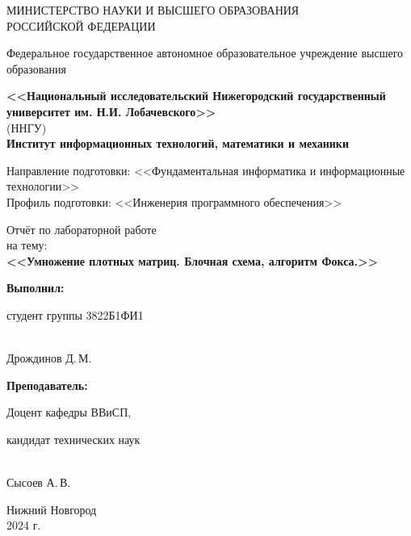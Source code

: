 \documentclass{report}
\begin{document}
\begin{titlepage}
	\begin{center}
		\large
		{МИНИСТЕРСТВО НАУКИ И ВЫСШЕГО ОБРАЗОВАНИЯ\\ РОССИЙСКОЙ ФЕДЕРАЦИИ}
		
		Федеральное государственное автономное образовательное учреждение высшего образования
		\vspace{0.5cm}
		
		\textbf{<<Национальный исследовательский Нижегородский государственный университет им. Н.И. Лобачевского>>}\\
		(ННГУ)\\
		\vspace{1cm}
		\textbf{Институт информационных технологий, математики и механики}\\
		\vspace{1cm}
		
		Направление подготовки: <<Фундаментальная информатика и информационные технологии>>\\
		Профиль подготовки: <<Инженерия программного обеспечения>>
		\vfill
		
		\vfill
		
		\Large
		Отчёт по лабораторной работе \\ %
		на тему:\\
		\textbf{<<Умножение плотных матриц. Блочная схема, алгоритм Фокса.>>}
		{\LARGE 
		}
		\bigskip
		
		
	\end{center}
	\vfill
	
	\hfill\begin{minipage}{0.4\textwidth}
		\textbf{Выполнил:} 

            студент группы 3822Б1ФИ1 

            \underline{\hspace{3cm}} \\Дрождинов Д.\,М. \bigskip
            
	\end{minipage}%
	
	\hfill\begin{minipage}{0.4\textwidth}
		\textbf{Преподаватель:}
  
		Доцент кафедры ВВиСП,
        
        кандидат технических наук
  
		\underline{\hspace{3cm}} \\Сысоев А.\,В.
	\end{minipage}%
	\vfill
	
	\begin{center}
		Нижний Новгород\\
		2024 г.
	\end{center}
\end{titlepage}
\end{document}
